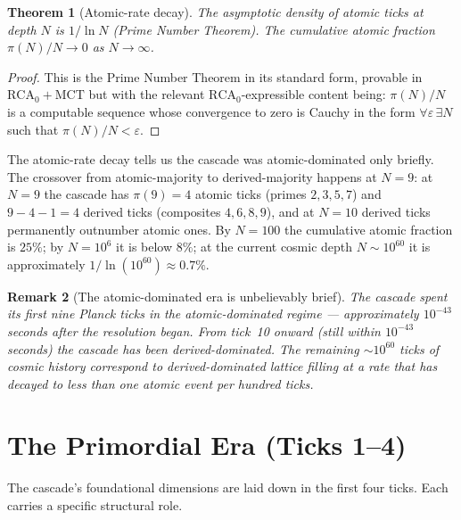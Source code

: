 \documentclass[11pt,a4paper]{article}
\newtheorem{theorem}{Theorem}[section]
\newtheorem{remark}[theorem]{Remark}
\begin{document}
\begin{theorem}[Atomic-rate decay]\label{thm:atomic-rate}
The asymptotic density of atomic ticks at depth $N$ is $1/\ln N$
(Prime Number Theorem). The cumulative atomic fraction
$\pi(N)/N \to 0$ as $N \to \infty$.
\end{theorem}

\begin{proof}
This is the Prime Number Theorem in its standard form, provable in
$\mathrm{RCA}_0 + \mathrm{MCT}$ but with the relevant
$\mathrm{RCA}_0$-expressible content being: $\pi(N)/N$ is a
computable sequence whose convergence to zero is Cauchy in the form
$\forall\varepsilon\,\exists N$ such that $\pi(N)/N < \varepsilon$.
\end{proof}

\noindent The atomic-rate decay tells us the cascade was
atomic-dominated only briefly. The crossover from
atomic-majority to derived-majority happens at $N = 9$: at $N = 9$
the cascade has $\pi(9) = 4$ atomic ticks (primes $2, 3, 5, 7$) and
$9 - 4 - 1 = 4$ derived ticks (composites $4, 6, 8, 9$), and at
$N = 10$ derived ticks permanently outnumber atomic ones. By
$N = 100$ the cumulative atomic fraction is $25\%$; by $N = 10^6$
it is below $8\%$; at the current cosmic depth
$N \sim 10^{60}$ it is approximately $1/\ln(10^{60}) \approx 0.7\%$.

\begin{remark}[The atomic-dominated era is unbelievably brief]
The cascade spent its first nine Planck ticks in the atomic-dominated
regime --- approximately $10^{-43}$ seconds after the resolution
began. From tick~10 onward (still within $10^{-43}$ seconds) the
cascade has been derived-dominated. The remaining $\sim 10^{60}$
ticks of cosmic history correspond to derived-dominated lattice
filling at a rate that has decayed to less than one atomic event per
hundred ticks.
\end{remark}

\section{The Primordial Era (Ticks 1--4)}\label{sec:primordial-era}

The cascade's foundational dimensions are laid down in the first four
ticks. Each carries a specific structural role.
\end{document}
